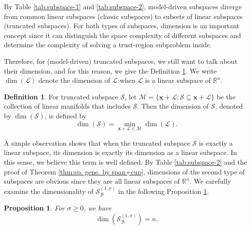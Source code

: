 \documentclass[colorlinks=true, linkcolor=blue, citecolor=blue, urlcolor=blue]{article}
\theoremstyle{plain}
\newtheorem{proposition}[theorem]{Proposition}
\theoremstyle{definition}
\newtheorem{definition}[theorem]{Definition}
\theoremstyle{remark}
\begin{document}
By Table \ref{tab:subspace-1} and \ref{tab:subspace-2}, model-driven subspaces diverge from common linear subspaces (classic subspaces) to subsets of linear subspaces (truncated subspaces). For both types of subspaces, dimension is an important concept since it can distinguish the space complexity of different subspaces and determine the complexity of solving a trust-region subproblem inside.


Therefore, for (model-driven) truncated subspaces, we still want to talk about their dimension, and for this reason, we give the Definition \ref{def:dimension of subspace}. We write $\dim(\mathcal{L})$ denote the dimension of $\mathcal{L}$ when $\mathcal{L}$ is a linear subspace of $\mathbb{R}^n$.

\begin{definition}\label{def:dimension of subspace}
    For truncated subspace $\mathcal{S}$, let $\mathcal{M}=\{\bm x+\mathcal{L}:\mathcal{S}\subseteq \bm x+\mathcal{L} \}$ be the collection of linear manifolds that includes $\mathcal{S}$. Then the dimension of $\mathcal{S}$, denoted by $\dim(\mathcal{S})$, is defined by 
    \begin{equation*}
        \dim(\mathcal{S})=\min_{\bm x+\mathcal{L}\in\mathcal{M}}\dim(\mathcal{L}).
    \end{equation*}
\end{definition}

A simple observation shows that when the truncated subspace $\mathcal{S}$ is exactly a linear subspace, its dimension is exactly its dimension as a linear subspace. In this sense, we believe this term is well defined. By Table \ref{tab:subspace-2} and the proof of Theorem \ref{thm:sp. gene. by span+cup}, dimensions of the second type of subspaces are obvious since they are all linear subspaces of $\mathbb{R}^n$. We carefully examine the dimensionality of $\mathcal{S}_{\mathcal{B}}^{(1,\sigma)}$ in the following Proposition \ref{prop: dim of sp1}.
\begin{proposition}\label{prop: dim of sp1}
For $\sigma\geq 0$, we have
    \begin{equation*}  \dim(\mathcal{S}_{\mathcal{B}}^{(1,\sigma)})=n.
    \end{equation*}
\end{proposition}
\end{document}
